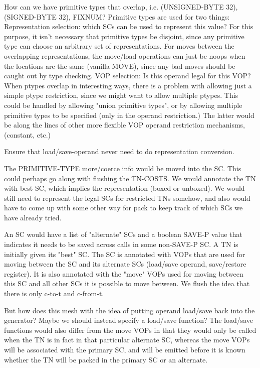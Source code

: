 How can we have primitive types that overlap, i.e. (UNSIGNED-BYTE 32),
(SIGNED-BYTE 32), FIXNUM?
Primitive types are used for two things:
    Representation selection: which SCs can be used to represent this value?
	For this purpose, it isn't necessary that primitive types be disjoint,
	since any primitive type can choose an arbitrary set of
	representations.  For moves between the overlapping representations,
	the move/load operations can just be noops when the locations are the
	same (vanilla MOVE), since any bad moves should be caught out by type
	checking.
    VOP selection:
	Is this operand legal for this VOP?  When ptypes overlap in interesting
	ways, there is a problem with allowing just a simple ptype restriction,
	since we might want to allow multiple ptypes.  This could be handled
	by allowing "union primitive types", or by allowing multiple primitive
	types to be specified (only in the operand restriction.)  The latter
	would be along the lines of other more flexible VOP operand restriction
	mechanisms, (constant, etc.)



Ensure that load/save-operand never need to do representation conversion.

The PRIMITIVE-TYPE more/coerce info would be moved into the SC.  This could
perhaps go along with flushing the TN-COSTS.  We would annotate the TN with
best SC, which implies the representation (boxed or unboxed).  We would still
need to represent the legal SCs for restricted TNs somehow, and also would have to
come up with some other way for pack to keep track of which SCs we have already
tried.

An SC would have a list of "alternate" SCs and a boolean SAVE-P value that
indicates it needs to be saved across calls in some non-SAVE-P SC.  A TN is
initially given its "best" SC.  The SC is annotated with VOPs that are used for
moving between the SC and its alternate SCs (load/save operand, save/restore
register).  It is also annotated with the "move" VOPs used for moving between
this SC and all other SCs it is possible to move between.  We flush the idea
that there is only c-to-t and c-from-t.

But how does this mesh with the idea of putting operand load/save back into the
generator?  Maybe we should instead specify a load/save function?  The
load/save functions would also differ from the move VOPs in that they would
only be called when the TN is in fact in that particular alternate SC, whereas
the move VOPs will be associated with the primary SC, and will be emitted
before it is known whether the TN will be packed in the primary SC or an
alternate.

